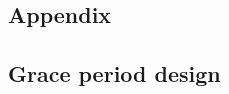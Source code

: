 \documentclass[11pt]{article}
\begin{document}
\begin{appendix}

    \renewcommand{\thefigure}{A\arabic{figure}}
    \setcounter{figure}{0}
    
    \renewcommand{\thetable}{A\arabic{table}}
    \setcounter{table}{0}
    
    \renewcommand{\theequation}{A\arabic{equation}}
    \setcounter{equation}{0}

    \newpage

    \section{Appendix}

    \subsection{Grace period design}


\end{appendix}
\end{document}
